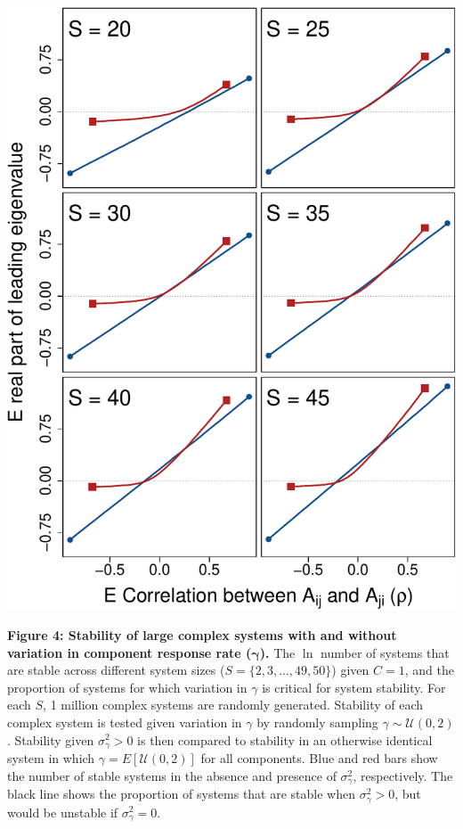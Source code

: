 \documentclass[]{article}
\begin{document}
\includegraphics{ms_files/figure-latex/unnamed-chunk-13-1.pdf}

\clearpage

\textbf{Figure 4: Stability of large complex systems with and without
variation in component response rate (\(\boldsymbol{\gamma}\)).} The
\(\ln\) number of systems that are stable across different system sizes
(\(S = \{2, 3, ..., 49, 50 \}\)) given \(C = 1\), and the proportion of
systems for which variation in \(\gamma\) is critical for system
stability. For each \(S\), 1 million complex systems are randomly
generated. Stability of each complex system is tested given variation in
\(\gamma\) by randomly sampling \(\gamma \sim \mathcal{U}(0, 2)\).
Stability given \(\sigma^{2}_{\gamma}>0\) is then compared to stability
in an otherwise identical system in which
\(\gamma = E[\mathcal{U}(0, 2)]\) for all components. Blue and red bars
show the number of stable systems in the absence and presence of
\(\sigma^{2}_{\gamma}\), respectively. The black line shows the
proportion of systems that are stable when \(\sigma^{2}_{\gamma}>0\),
but would be unstable if \(\sigma^{2}_{\gamma}=0\).
\end{document}
